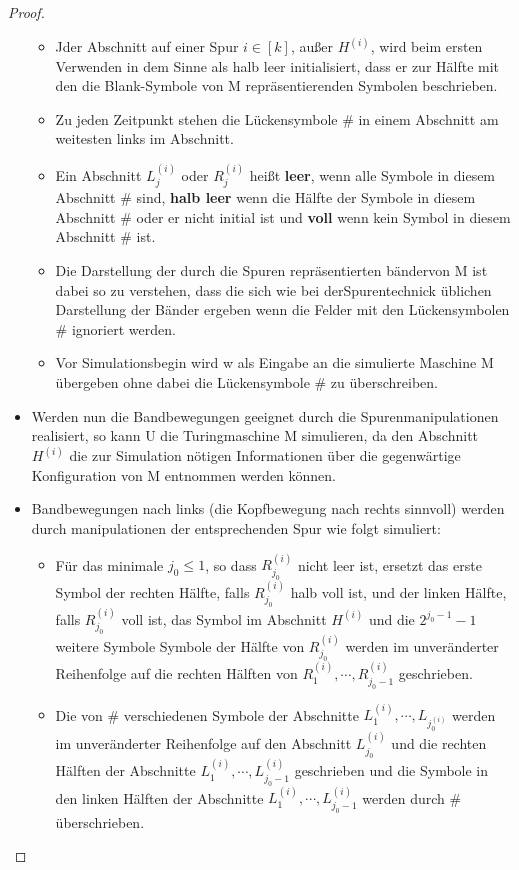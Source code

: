 \begin{proof}
\begin{itemize}
\begin{itemize}
                    \item Jder Abschnitt auf einer Spur \(i \in [k]\), außer \(H^{(i)}\), wird beim ersten Verwenden in dem Sinne als halb leer initialisiert, dass er zur Hälfte mit den die Blank-Symbole von M repräsentierenden Symbolen beschrieben.
                    \item Zu jeden Zeitpunkt stehen die Lückensymbole \# in einem Abschnitt am weitesten links im Abschnitt.
                    \item Ein Abschnitt \(L_j^{(i)}\) oder \(R_j^{(i)}\) heißt \textbf{leer}, wenn alle Symbole in diesem Abschnitt \# sind, \textbf{halb leer} wenn die Hälfte der Symbole in diesem Abschnitt \# oder er nicht initial ist und \textbf{voll} wenn kein Symbol in diesem Abschnitt \# ist.
                    \item Die Darstellung der durch die Spuren repräsentierten bändervon M ist dabei so zu verstehen, dass die sich wie bei derSpurentechnick üblichen Darstellung der Bänder ergeben wenn die Felder mit den Lückensymbolen \# ignoriert werden.
                    \item Vor Simulationsbegin wird w als Eingabe an die simulierte Maschine M übergeben ohne dabei die Lückensymbole \# zu überschreiben. 
                \end{itemize}
                \item Werden nun die Bandbewegungen geeignet durch die Spurenmanipulationen realisiert, so kann U die Turingmaschine M simulieren, da den Abschnitt \(H^{(i)}\) die zur Simulation nötigen Informationen über die gegenwärtige Konfiguration von M entnommen werden können.
                \item Bandbewegungen nach links (die Kopfbewegung nach rechts sinnvoll) werden durch manipulationen der entsprechenden Spur wie folgt simuliert:
                \begin{itemize}
                    \item Für das minimale \(j_0 \leq 1\), so dass \(R_{j_0}^{(i)}\) nicht leer ist, ersetzt das erste Symbol der rechten Hälfte, falls \(R_{j_0}^{(i)}\) halb voll ist, und der linken Hälfte, falls \(R_{j_0}^{(i)}\) voll ist, das Symbol im Abschnitt \(H^{(i)}\) und die \(2^{j_0 - 1}-1\) weitere Symbole Symbole der Hälfte von \(R_{j_0}^{(i)}\) werden im unveränderter Reihenfolge auf die rechten Hälften von \(R_1^{(i)}, \cdots, R_{j_0-1}^{(i)}\) geschrieben.
                    \item Die von \# verschiedenen Symbole der Abschnitte \(L_1^{(i)}, \cdots, L_{j_0^{(i)}}\) werden im unveränderter Reihenfolge auf den Abschnitt \(L_{j_0}^{(i)}\) und die rechten Hälften der Abschnitte \(L_1^{(i)}, \cdots, L_{j_0 -1}^{(i)}\) geschrieben und die Symbole in den linken Hälften der Abschnitte \(L_1^{(i)}, \cdots, L_{j_0 -1}^{(i)}\) werden durch \# überschrieben.

\end{itemize}
\end{itemize}
\end{proof}
